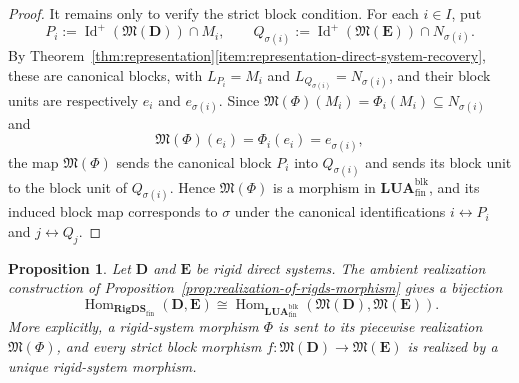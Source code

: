 \documentclass[pdflatex,sn-mathphys-num]{sn-jnl}
\theoremstyle{thmstyleone}%
\newtheorem{proposition}[theorem]{Proposition}
\theoremstyle{thmstyletwo}%
\theoremstyle{thmstylethree}%
\newcommand{\PosId}{\operatorname{Id}^{+}}
\newcommand{\layer}[1]{L_{#1}}
\begin{document}
\begin{proof}
It remains only to verify the strict block condition.
For each \(i\in I\), put
\[
P_i:=\PosId(\mathfrak M(\mathbf D))\cap M_i,
\qquad
Q_{\sigma(i)}:=\PosId(\mathfrak M(\mathbf E))\cap N_{\sigma(i)}.
\]
By Theorem~\ref{thm:representation}\ref{item:representation-direct-system-recovery}, these are canonical blocks, with \(\layer{P_i}=M_i\) and \(\layer{Q_{\sigma(i)}}=N_{\sigma(i)}\), and their block units are respectively \(e_i\) and \(e_{\sigma(i)}\).
Since \(\mathfrak M(\Phi)(M_i)=\Phi_i(M_i)\subseteq N_{\sigma(i)}\) and
\[
\mathfrak M(\Phi)(e_i)=\Phi_i(e_i)=e_{\sigma(i)},
\]
the map \(\mathfrak M(\Phi)\) sends the canonical block \(P_i\) into \(Q_{\sigma(i)}\) and sends its block unit to the block unit of \(Q_{\sigma(i)}\).
Hence \(\mathfrak M(\Phi)\) is a morphism in \(\mathbf{LUA}^{\mathrm{blk}}_{\mathrm{fin}}\), and its induced block map corresponds to \(\sigma\) under the canonical identifications \(i\leftrightarrow P_i\) and \(j\leftrightarrow Q_j\).
\end{proof}

\begin{proposition}\label{prop:ambient-maps-vs-rigds-morphisms}
Let \(\mathbf D\) and \(\mathbf E\) be rigid direct systems.
The ambient realization construction of Proposition~\ref{prop:realization-of-rigds-morphism} gives a bijection
\[
\operatorname{Hom}_{\mathbf{RigDS}_{\mathrm{fin}}}(\mathbf D,\mathbf E)
\cong
\operatorname{Hom}_{\mathbf{LUA}^{\mathrm{blk}}_{\mathrm{fin}}}
(\mathfrak M(\mathbf D),\mathfrak M(\mathbf E)).
\]
More explicitly, a rigid-system morphism \(\Phi\) is sent to its piecewise realization \(\mathfrak M(\Phi)\), and every strict block morphism \(f\colon \mathfrak M(\mathbf D)\to \mathfrak M(\mathbf E)\) is realized by a unique rigid-system morphism.
\end{proposition}
\end{document}
